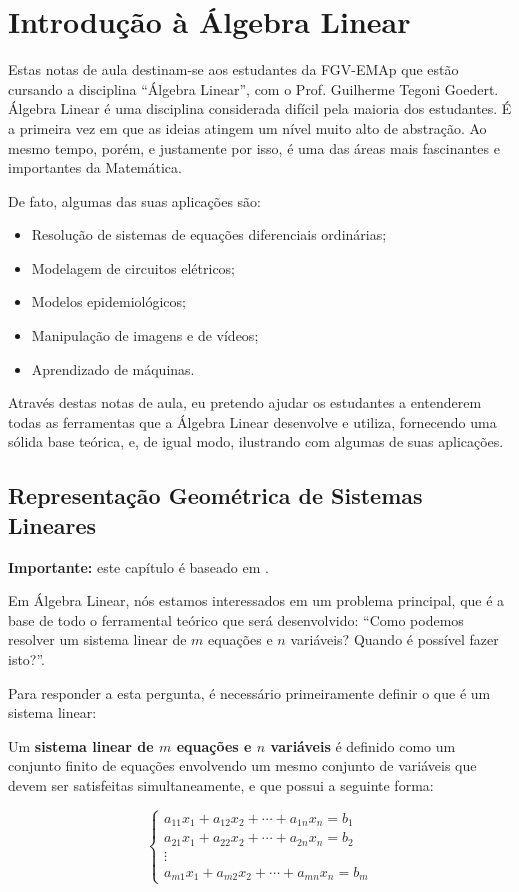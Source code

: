 \chapter{Introdução à Álgebra Linear}
\label{cap:introdução}

Estas notas de aula destinam-se aos estudantes da FGV-EMAp que estão cursando a disciplina ``Álgebra Linear'', com o Prof. Guilherme Tegoni Goedert. Álgebra Linear é uma disciplina considerada difícil pela maioria dos estudantes. É a primeira vez em que as ideias atingem um nível muito alto de abstração. Ao mesmo tempo, porém, e justamente por isso, é uma das áreas mais fascinantes e importantes da Matemática.

De fato, algumas das suas aplicações são:

\begin{itemize}
	\item Resolução de sistemas de equações diferenciais ordinárias;
	\item Modelagem de circuitos elétricos;
	\item Modelos epidemiológicos;
	\item Manipulação de imagens e de vídeos;
	\item Aprendizado de máquinas.
\end{itemize}

Através destas notas de aula, eu pretendo ajudar os estudantes a entenderem todas as ferramentas que a Álgebra Linear desenvolve e utiliza, fornecendo uma sólida base teórica, e, de igual modo, ilustrando com algumas de suas aplicações.

\section{Representação Geométrica de Sistemas Lineares}

\textbf{Importante:} este capítulo é baseado em \cite{slide1doyuri}.

Em Álgebra Linear, nós estamos interessados em um problema principal, que é a base de todo o ferramental teórico que será desenvolvido: ``Como podemos resolver um sistema linear de $m$ equações e $n$ variáveis? Quando é possível fazer isto?''.

Para responder a esta pergunta, é necessário primeiramente definir o que é um sistema linear:

\begin{Definition}
	Um \textbf{sistema linear de $m$ equações e $n$ variáveis} é definido como um conjunto finito de equações envolvendo um mesmo conjunto de variáveis que devem ser satisfeitas simultaneamente, e que possui a seguinte forma:
	
	$$
	\begin{cases}
		a_{11}x_1 + a_{12}x_2 + \cdots + a_{1n}x_n = b_1 \\
		a_{21}x_1 + a_{22}x_2 + \cdots + a_{2n}x_n = b_2 \\
		\vdots \\
		a_{m1}x_1 + a_{m2}x_2 + \cdots + a_{mn}x_n = b_m
	\end{cases}
	$$
\end{Definition}

